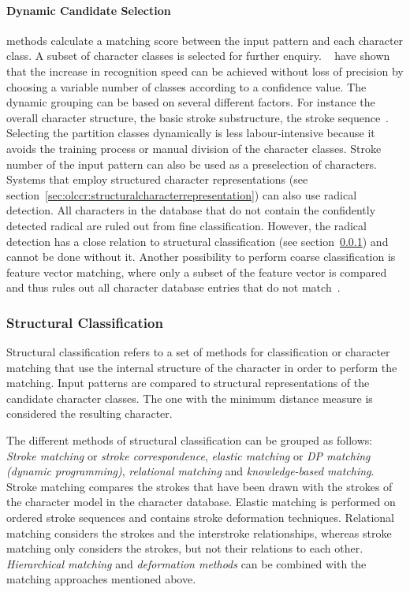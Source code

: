 \paragraph{Dynamic Candidate Selection} methods calculate a matching score between 
the input pattern and each character class. A subset of character classes is 
selected for further enquiry.
~\citeyear{LiuNakagawa2000} have shown that the 
increase in recognition speed can be achieved without loss of precision by 
choosing a variable number of classes according to a confidence value.
The dynamic grouping can be based on several different factors. For instance
the overall character structure, the basic stroke substructure, the stroke 
sequence~.
Selecting the partition classes dynamically is less labour-intensive because it
avoids the training process or manual division of the character classes.
Stroke number of the input pattern can also be used as a preselection of
characters. Systems that employ structured character representations (see 
section~\ref{sec:olccr:structuralcharacterrepresentation}) can also use radical 
detection. All characters in the database that do not contain the confidently 
detected radical are ruled out from fine classification. However, the radical
detection has a close relation to structural classification (see 
section~\ref{sec:olccr:structuralclassification}) and cannot be done without it.
Another possibility to perform coarse classification is feature vector matching,
where only a subset of the feature vector is compared and thus rules out all
character database entries that do not match~.

\subsubsection{Structural Classification}
\label{sec:olccr:structuralclassification}

Structural classification refers to a set of methods for classification or
character matching that use the internal structure of the character in order to
perform the matching. Input patterns are compared to structural representations
of the candidate character classes.
The one with the minimum distance measure is considered the resulting character.

The different methods of structural classification can be grouped as follows:\\
\emph{Stroke matching} or \emph{stroke correspondence}, 
\emph{elastic matching} or \emph{DP matching (dynamic programming)}, 
\emph{relational matching} and \emph{knowledge-based matching}.
Stroke matching compares the strokes that have been drawn with the strokes of the
character model in the character database. Elastic matching is performed on 
ordered stroke sequences and contains stroke deformation techniques. 
Relational matching considers the strokes and the interstroke relationships, 
whereas stroke matching only considers the strokes, but not their relations 
to each other. \emph{Hierarchical matching} and \emph{deformation methods} can
be combined with the matching approaches mentioned above.

